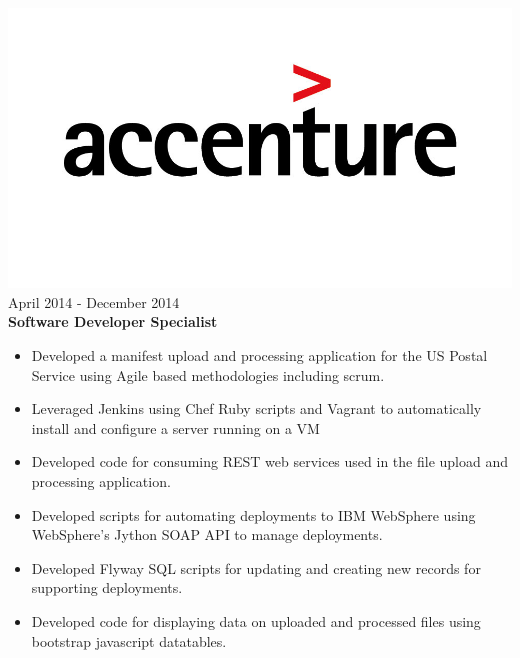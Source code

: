 \documentclass[12pt, line, margin]{res}
\begin{document}
\begin{resume}
	      {\sl  \includegraphics[scale=0.1, trim=110 200 110 120]{resume_images/accenture-logo.jpg}} \hfill April 2014 - December 2014 \\
                \textbf{Software Developer Specialist}
                 \begin{itemize}  \itemsep -2pt %
                \item   Developed a manifest upload and processing application for
                               the US Postal Service using Agile based methodologies including scrum.
                \item   Leveraged Jenkins using Chef Ruby scripts and Vagrant\newline
                               to automatically install and configure a server running on a VM
	      \item   Developed code for consuming REST web services used
                               in the file upload and processing application.
	      \item   Developed scripts for automating deployments to IBM WebSphere
                               using WebSphere’s Jython SOAP API to manage deployments.
	      \item   Developed Flyway SQL scripts for updating and creating new 
                               records for supporting deployments.
	      \item   Developed code for displaying data on uploaded and processed
                               files using bootstrap javascript datatables.
                \end{itemize}


\end{resume}
\end{document}
